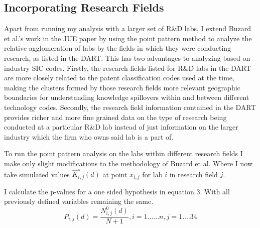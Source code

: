 \documentclass[12pt,letterpaper]{article}
\begin{document}
\subsection{Incorporating Research Fields}
Apart from running my analysis with a larger set of R\&D labs, I extend Buzard et al.'s work in the JUE paper by using the point pattern method to analyze the relative agglomeration of labs by the fields in which they were conducting research, as listed in the DART. This has two advantages to analyzing based on industry SIC codes. Firstly, the research fields listed for R\&D labs in the DART are more closely related to the patent classification codes used at the time, making the clusters formed by those research fields more relevant geographic boundaries for understanding knowledge spillovers within and between different technology codes. Secondly, the research field information contained in the DART provides richer and more fine grained data on the type of research being conducted at a particular R\&D lab instead of just information on the larger industry which the firm who owns said lab is a part of. 
\par 
To run the point pattern analysis on the labs within different research fields I make only slight modifications to the methodology of Buzard et al. Where I now take simulated values \(\hat{K}_{i,j}^s(d)\) at point \(x_{i,j}\) for lab \(i\) in research field \(j\). 
\par 
I calculate the p-values for a one sided hypothesis in equation 3. With all previously defined variables remaining the same. 
\begin{equation}
    P_{i,j}(d) = \frac{N_{i,j}^0(d)}{N+1},i=1......n,j=1....34
\end{equation}
\end{document}
